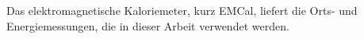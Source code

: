 Das elektromagnetische Kaloriemeter, kurz EMCal, liefert die Orts- und Energiemessungen, die in dieser Arbeit verwendet werden.
